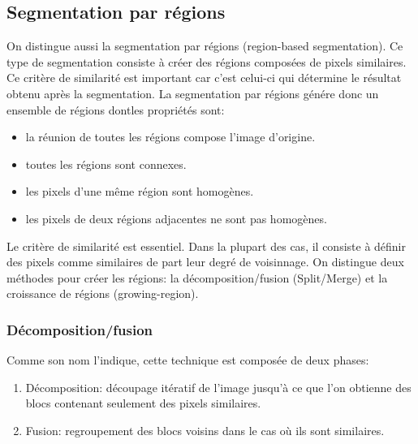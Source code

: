 \documentclass[]{report}
\begin{document}
      
      \subsection{Segmentation par régions}
      On distingue aussi la segmentation par régions (region-based segmentation). Ce type de segmentation consiste à créer des régions composées de pixels similaires. Ce critère de similarité est important car c'est celui-ci qui détermine le résultat obtenu après la segmentation. La segmentation par régions génére donc un ensemble de régions dontles propriétés sont:
      \begin{itemize}
        \item la réunion de toutes les régions compose l'image d'origine.
        \item toutes les régions sont connexes.
        \item les pixels d'une même région sont homogènes.
        \item les pixels de deux régions adjacentes ne sont pas homogènes.
      \end{itemize}
      
      Le critère de similarité est essentiel. Dans la plupart des cas, il consiste à définir des pixels comme similaires de part leur degré de voisinnage. On distingue deux méthodes pour créer les régions: la décomposition/fusion (Split/Merge) et la croissance de régions (growing-region).
      
      \subsubsection{Décomposition/fusion}
        Comme son nom l'indique, cette technique est composée de deux phases:
        \begin{enumerate}
          \item Décomposition: découpage itératif de l'image jusqu'à ce que l'on obtienne des blocs contenant seulement des pixels similaires.
          \item Fusion: regroupement des blocs voisins dans le cas où ils sont similaires.
        \end{enumerate}
        
\end{document}
